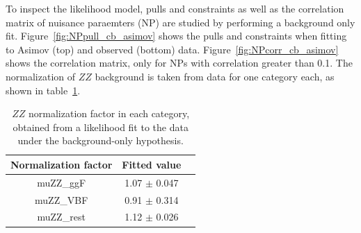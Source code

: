 To inspect the likelihood model, pulls and constraints as well as the correlation matrix of nuisance paraemters (NP) are studied by performing a background only fit.
Figure~\ref{fig:NPpull_cb_asimov} shows the pulls and constraints when fitting to Asimov (top) and observed (bottom) data.
Figure~\ref{fig:NPcorr_cb_asimov} shows the correlation matrix, only for NPs with correlation greater than 0.1.
The normalization of $ZZ$ background is taken from data for one category each, as shown in table~\ref{tab:muZZ_bonly_dnn}.

\begin{table}[htbp]
  \centering
  \caption{$ZZ$ normalization factor in each category, obtained from a likelihood fit to the data under the background-only hypothesis.}
  \label{tab:muZZ_bonly_dnn}
  \small
  \begin{spacing}{0.8}
  \begin{tabular}{ccc}
    \toprule
     Normalization factor  & Fitted value \\
    \midrule
    muZZ\_ggF  & 1.07 $\pm$ 0.047 \\
    \hline
    muZZ\_VBF  & 0.91 $\pm$ 0.314 \\
    \hline
    muZZ\_rest & 1.12 $\pm$ 0.026 \\
    \bottomrule
  \end{tabular}
  \end{spacing}
\end{table}


